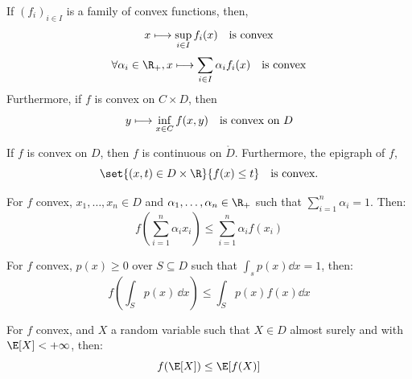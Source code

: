 \documentclass[toc, titlepaged]{../cs-classes/cs-classes}
\begin{document}
\begin{property}
    If $(f_i)_{i\in I}$ is a family of convex functions, then,
    \begin{equation*}
        x \longmapsto \sup_{i\in I} f_i(x) \quad\textnormal{is convex}
    \end{equation*}
    \begin{equation*}
        \forall \alpha_i\in\R_+, x \longmapsto \sum_{i\in I} \alpha_i f_i(x) \quad\textnormal{is convex}
    \end{equation*}
    Furthermore, if $f$ is convex on $C\times D$, then
    \begin{equation*}
        y \longmapsto \inf_{x\in C} f(x, y) \quad \textnormal{is convex on $D$}
    \end{equation*}
\end{property}

\begin{property}
    If $f$ is convex on $D$, then $f$ is continuous on $\mathring{D}$. Furthermore, the epigraph of $f$,
    \begin{equation*}
        \set{(x, t)\in D\times\R}{f(x)\leq t} \quad \textnormal{is convex.}
    \end{equation*}
\end{property}

\begin{property}
    For $f$ convex, $x_1, \dots, x_n\in D$ and $\alpha_1,\dots, \alpha_n\in\R_+$ such that $\sum_{i=1}^n\alpha_i=1$. Then:
    \begin{equation*}
        f\left(\sum_{i=1}^n\alpha_ix_i\right) \leq \sum_{i=1}^n\alpha_if(x_i)
    \end{equation*}
\end{property}

\begin{property}
    For $f$ convex, $p(x)\geq0$ over $S\subseteq D$ such that $\int_s p(x)\dd x=1$, then:
    \begin{equation*}
        f\left(\int_Sp(x)\,\dd x\right) \leq \int_Sp(x)f(x)\dd x
    \end{equation*}
\end{property}

\begin{property}
    For $f$ convex, and $X$ a random variable such that $X\in D$ almost surely and with $\E[X]<+\infty$, then:
    \begin{equation*}
        f(\E[X])\leq\E[f(X)]
    \end{equation*}
\end{property}
\end{document}
